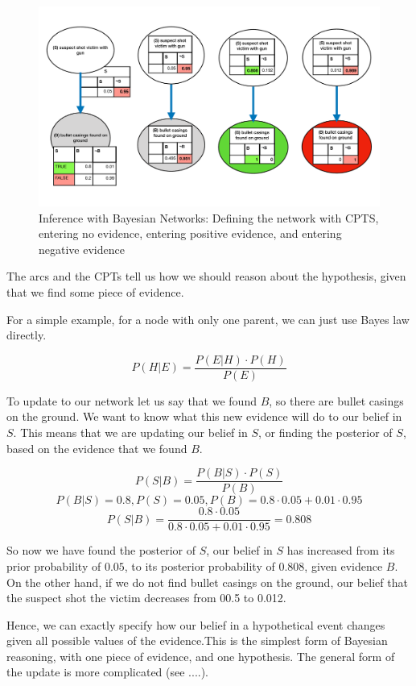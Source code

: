 \documentclass[12pt]{article}
\begin{document}
\begin{figure}[htbp]
\begin{center}
\includegraphics[width=\linewidth]{images/basicBayes}
\caption{Inference with Bayesian Networks: Defining the network with CPTS, entering no evidence, entering positive evidence, and entering negative evidence}
\label{exampleBN}
\end{center}
\end{figure}


The arcs and the CPTs tell us how we should reason about the hypothesis, given that we find some piece of evidence.


For a simple example, for a node with only one parent, we can just use Bayes law directly.


\[ P(H | E) =  \frac{P(E | H) \cdot P(H)}{P(E)}\]




To update to our network let us say that we found $B$, so there are bullet casings on the ground. We want to know what this new evidence will do to our belief in $S$. This means that we are updating our belief in $S$, or finding the posterior of $S$, based on the evidence that we found $B$.

\[ P(S | B) =  \frac{P(B | S) \cdot P(S)}{P(B)}\]
\[ P(B | S) = 0.8, P(S) = 0.05, P(B) = 0.8 \cdot 0.05 + 0.01 \cdot 0.95\]
\[ P(S | B) =  \frac{0.8 \cdot 0.05}{0.8 \cdot 0.05 + 0.01 \cdot 0.95} = 0.808\]

So now we have found the posterior of $S$, our belief in $S$ has increased from its prior probability of $0.05$, to its posterior probability of $0.808$, given evidence $B$. On the other hand, if we do not find bullet casings on the ground, our belief that the suspect shot the victim decreases from 00.5 to 0.012. 


Hence, we can exactly specify how our belief in a hypothetical event changes given all possible values of the evidence.This is the simplest form of Bayesian reasoning, with one piece of evidence, and one hypothesis. The general form of the update is more complicated (see ....).
\end{document}

